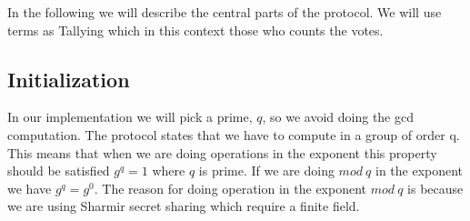 \noindent
In the following we will describe the central parts of the protocol. We will use terms as Tallying which in this context those who counts the votes.

\subsection{Initialization}



 In our implementation we will pick a prime, \begin{math}q\end{math}, so we avoid doing the gcd computation. The protocol states that we have to compute in a group of order q. This means that when we are doing operations in the exponent this property should be satisfied \begin{math}g^q=1\end{math} where \begin{math}q\end{math} is prime. If we are doing \begin{math}mod \ q \end{math} in the exponent we have \begin{math}g^q=g^0\end{math}. The reason for doing operation in the exponent \begin{math}mod \ q\end{math} is because we are using Sharmir secret sharing which require a finite field.\\\\

